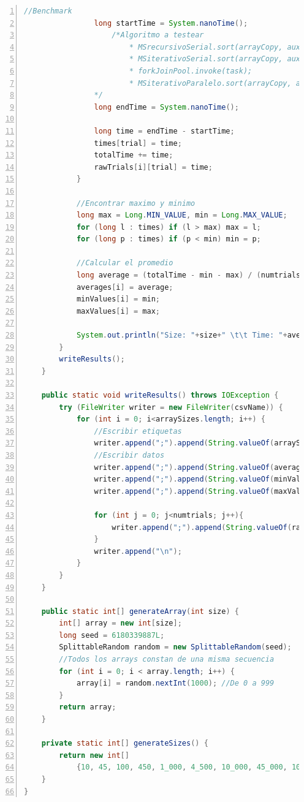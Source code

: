 \documentclass[titlepage]{article}
\begin{document}
	
	\begin{lstlisting}[language=java,frame=single,numbers=left,float=!hp]
				//Benchmark
				long startTime = System.nanoTime();
					/*Algoritmo a testear
						* MSrecursivoSerial.sort(arrayCopy, aux, 0, size-1);
						* MSiterativoSerial.sort(arrayCopy, aux);
						* forkJoinPool.invoke(task);
						* MSiterativoParalelo.sort(arrayCopy, aux, executorService);
				*/
				long endTime = System.nanoTime();
				
				long time = endTime - startTime;
				times[trial] = time;
				totalTime += time;
				rawTrials[i][trial] = time;
			}
			
			//Encontrar maximo y minimo
			long max = Long.MIN_VALUE, min = Long.MAX_VALUE;
			for (long l : times) if (l > max) max = l;
			for (long p : times) if (p < min) min = p;

			//Calcular el promedio
			long average = (totalTime - min - max) / (numtrials - 2);
			averages[i] = average;
			minValues[i] = min;
			maxValues[i] = max;
			
			System.out.println("Size: "+size+" \t\t Time: "+average);
		}
		writeResults();
	}

	public static void writeResults() throws IOException {
		try (FileWriter writer = new FileWriter(csvName)) {
			for (int i = 0; i<arraySizes.length; i++) {
				//Escribir etiquetas
				writer.append(";").append(String.valueOf(arraySizes[i]));
				//Escribir datos
				writer.append(";").append(String.valueOf(averages[i]));
				writer.append(";").append(String.valueOf(minValues[i]));
				writer.append(";").append(String.valueOf(maxValues[i]));
				
				for (int j = 0; j<numtrials; j++){
					writer.append(";").append(String.valueOf(rawTrials[i][j]));
				}
				writer.append("\n");
			}
		}
	}

	public static int[] generateArray(int size) {
		int[] array = new int[size];
		long seed = 6180339887L;
		SplittableRandom random = new SplittableRandom(seed);
		//Todos los arrays constan de una misma secuencia
		for (int i = 0; i < array.length; i++) {
			array[i] = random.nextInt(1000); //De 0 a 999
		}
		return array;
	}

	private static int[] generateSizes() {
		return new int[]
			{10, 45, 100, 450, 1_000, 4_500, 10_000, 45_000, 100_000, 450_000, 1_000_000, 4_500_000, 10_000_000, 45_000_000, 100_000_000};
	}
}	
	\end{lstlisting}
\end{document}
